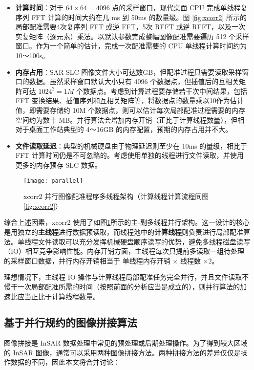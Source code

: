 \begin{itemize}
    \item \textbf{计算时间}：对于 $64 \times 64 = 4096$ 点的采样窗口，现代桌面 CPU 完成单线程复序列 FFT 计算的时间大约在几 ms 到 50ms 的数量级\cite{fftwbench}。图 \ref{fig:xcorr2} 所示的局部配准需要4次复序列 FFT 或逆 FFT，5次 RFFT 或逆 RFFT，以及一次实复矩阵（逐元素）乘法。以默认参数完成整幅图像配准需要遍历 512 个采样窗口。作为一个简单的估计，完成一次配准需要的 CPU 单线程计算时间约为 10～100s。
    \item \textbf{内存占用}：SAR SLC 图像文件大小可达数GB，但配准过程只需要读取采样窗口的数据。虽然采样窗口默认大小只有 $4096$ 个数据点，但插值后的互相关矩阵可达 $1024^2 = 1M$ 个数据点。考虑到计算过程要存储若干次中间结果，包括 FFT 变换结果、插值序列和互相关矩阵等，将数据点的数量乘以10作为估计值，即需要存储约 10M 个数据点，则可以估计每次局部配准过程需要的内存空间约为数十 MB。并行算法会增加内存开销（正比于计算线程数量），但相对于桌面工作站典型的 4～16GB 的内存配置，预期的内存占用并不大。
    \item \textbf{文件读取延迟}：典型的机械硬盘由于物理延迟则至少在 10ms 的量级\cite{wiki:hddcharacter}，相比于 FFT 计算时间仍是不可忽略的。考虑使用单独的线程进行文件读取，并使用更多的内存预存 SLC 数据。
\end{itemize}

\begin{figure}[ht]
\centering
\texttt{[image: parallel]}
\caption{xcorr2 并行图像配准程序多线程架构（计算线程计算流程同图\ref{fig:xcorr2}）} \label{fig:parallel}
\end{figure}

综合上述因素，xcorr2 使用了如图\ref{fig:parallel}所示的主-副多线程并行架构。这一设计的核心是用独立的\textbf{主线程}进行数据预读取，而线程池中的\textbf{计算线程}则负责进行局部配准算法。单线程文件读取可以充分发挥机械硬盘顺序读写的优势，避免多线程磁盘读写（IO）相互竞争影响性能。内存开销方面，主线程每次只提前多读取一组待处理的采样窗口数据，并行内存开销相当于 单线程内存开销 $\times$ 线程数 $\times 2$。

理想情况下，主线程 IO 操作与计算线程局部配准任务完全并行，并且文件读取不慢于一次局部配准所需的时间（按照前面的分析应当是成立的），则并行算法的加速比应当正比于计算线程数量。

\subsection{基于并行规约的图像拼接算法}

图像拼接是 InSAR 数据处理中常见的预处理或后期处理操作。为了得到较大区域的 InSAR 图像，通常可以采用两种图像拼接方法。两种拼接方法的差异仅仅是操作数据的不同，因此本文将合并讨论：

